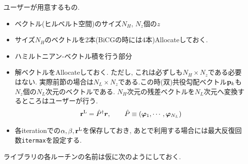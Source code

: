 \documentclass[12pt,titlepage]{jarticle}
\begin{document}
ユーザーが用意するもの.
\begin{itemize}
\item ベクトル(ヒルベルト空間)のサイズ$N_H$, $N_z$個の$z$
\item サイズ$N_H$のベクトルを2本(BiCGの時には4本)Allocateしておく.
\item ハミルトニアン-ベクトル積を行う部分
\item 解ベクトルをAllocateしておく. ただし, これは必ずしも$N_H \times N_z$である必要はない.
  実際前節の場合は$N_L \times N_z$である.この時(双)共役勾配ベクトル${{\bf p}_k}$も
  $N_z$個の$N_L$次元のベクトルである.
  $N_H$次元の残差ベクトルを$N_L$次元へ変換するところはユーザーが行う.
  \begin{align}
    {\bf r}^{\rm L} = {\hat P}^\dagger {\boldsymbol r}, \qquad
    {\hat P} \equiv ({\boldsymbol \varphi}_1, \cdots, {\boldsymbol \varphi}_{N_L})
  \end{align}
\item 各iterationでの$\alpha, \beta, {\bf r}^{\rm L}$を保存しておき, 
あとで利用する場合には最大反復回数\verb|itermax|を設定する.
\end{itemize}
ライブラリの各ルーチンの名前は仮に次のようにしておく.
\end{document}
